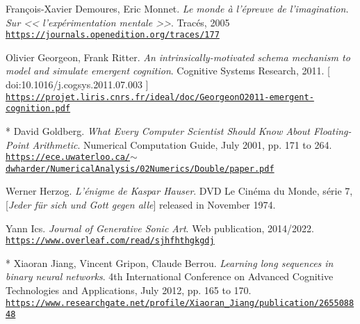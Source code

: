 \begin{thebibliography}{99}
	 François-Xavier Demoures, Eric Monnet. \textit{Le monde à l’épreuve de l’imagination. Sur << l’expérimentation mentale >>}. Tracés, 2005 \\ \href{https://journals.openedition.org/traces/177}{\scriptsize{\texttt{https://journals.openedition.org/traces/177}}} \normalsize{}
	 
	 Olivier Georgeon, Frank Ritter. \textit{An intrinsically-motivated schema mechanism to model and simulate emergent cognition}. 
	 Cognitive Systems Research, 2011. {\scriptsize [ doi:10.1016/j.cogsys.2011.07.003 ]}
	 \\ \href{https://projet.liris.cnrs.fr/ideal/doc/GeorgeonO2011-emergent-cognition.pdf}{\scriptsize{\texttt{https://projet.liris.cnrs.fr/ideal/doc/GeorgeonO2011-emergent-cognition.pdf}}} \normalsize{}
	 
	 
	 * David Goldberg. \textit{What Every Computer Scientist Should Know About Floating-Point Arithmetic}. Numerical Computation Guide, July 2001, pp. 171 to 264.\\ \href{https://ece.uwaterloo.ca/\~dwharder/NumericalAnalysis/02Numerics/Double/paper.pdf}{\scriptsize{\texttt{https://ece.uwaterloo.ca/$\sim$dwharder/NumericalAnalysis/02Numerics/Double/paper.pdf}}} \normalsize{}
	 
	 Werner Herzog. \textit{L'énigme de Kaspar Hauser}. DVD Le Cinéma du Monde, série 7, [\textit{Jeder für sich und Gott gegen alle}] released in November 1974.
	 
	 Yann Ics. \textit{Journal of Generative Sonic Art}. Web publication, 2014/2022.\\ \href{https://www.overleaf.com/read/sjhfhthgkgdj}{\scriptsize{\texttt{https://www.overleaf.com/read/sjhfhthgkgdj}}} \normalsize{}
	
	 * Xiaoran Jiang, Vincent Gripon, Claude Berrou. \textit{Learning long sequences in binary neural networks}. 4th International Conference on Advanced Cognitive Technologies and Applications, July 2012, pp. 165 to 170.\\ \href{https://www.researchgate.net/profile/Xiaoran\_Jiang/publication/265508848\_Learning\_Long\_Sequences\_in\_Binary\_Neural\_Networks/links/54107a6c0cf2f2b29a410d8c.pdf}{\scriptsize{\texttt{https://www.researchgate.net/profile/Xiaoran\_Jiang/publication/265508848}}} \normalsize{}
	 

\end{thebibliography}
